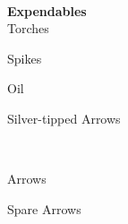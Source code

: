 \documentclass[11pt]{article}
\begin{document}
\\
\begin{minipage}[t]{\textwidth}
\vspace{0.6cm}
{\huge \textbf{\Fontauri Expendables}}\\
\Large{\textcolor{OCRA}{Torches}}\\
\end{minipage}
\begin{minipage}[t]{.45\textwidth}
\vspace{0.3cm}
\Large{\textcolor{OCRA}{Spikes}}\\
\end{minipage}
\begin{minipage}[t]{.2\textwidth}
\vspace{0.3cm}
\Large{\textcolor{OCRA}{Oil}}\\
\end{minipage}
\begin{minipage}[t]{.3\textwidth}
\vspace{0.3cm}
\Large{\textcolor{OCRA}{Silver-tipped Arrows}}\\
\end{minipage}\\
\begin{minipage}[t]{\textwidth}
\vspace{0.3cm}
\Large{\textcolor{OCRA}{Arrows}}\\
\end{minipage}
\begin{minipage}[t]{\textwidth}
\vspace{0.3cm}
\Large{\textcolor{OCRA}{Spare Arrows}}\\
\end{minipage}
\newpage
\hspace{0.04\textwidth}
\end{document}
